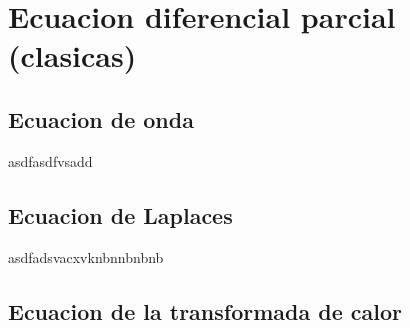 \chapter{Ecuacion diferencial parcial (clasicas)}
\section{Ecuacion de onda}
asdfasdfvsadd
\section{Ecuacion de Laplaces}
asdfadsvacxvknbnnbnbnb
\section{Ecuacion de la transformada de calor}
